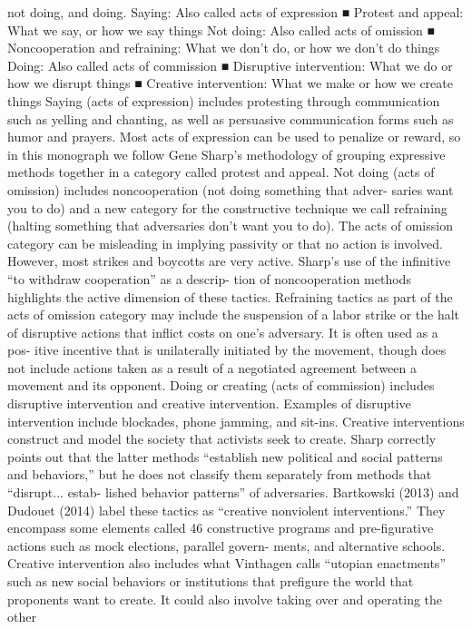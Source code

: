 \documentclass[twoside,a4paper,12pt,fleqn,openany]{extbook}
\begin{document}
not doing, and doing.
Saying: Also called acts of expression
■
 Protest and appeal: What we say, or how we say things
Not doing: Also called acts of omission
■
 Noncooperation and refraining: What we don’t do, or how we don’t do things
Doing: Also called acts of commission
■
 Disruptive intervention: What we do or how we disrupt things
■
 Creative intervention: What we make or how we create things
Saying (acts of expression) includes protesting through communication such as yelling
and chanting, as well as persuasive communication forms such as humor and prayers. Most
acts of expression can be used to penalize or reward, so in this monograph we follow Gene
Sharp’s methodology of grouping expressive methods together in a category called protest
and appeal.
Not doing (acts of omission) includes noncooperation (not doing something that adver-
saries want you to do) and a new category for the constructive technique we call refraining
(halting something that adversaries don’t want you to do). The acts of omission category can
be misleading in implying passivity or that no action is involved. However, most strikes and
boycotts are very active. Sharp’s use of the infinitive “to withdraw cooperation” as a descrip-
tion of noncooperation methods highlights the active dimension of these tactics. Refraining
tactics as part of the acts of omission category may include the suspension of a labor strike
or the halt of disruptive actions that inflict costs on one’s adversary. It is often used as a pos-
itive incentive that is unilaterally initiated by the movement, though does not include actions
taken as a result of a negotiated agreement between a movement and its opponent.
Doing or creating (acts of commission) includes disruptive intervention and creative
intervention. Examples of disruptive intervention include blockades, phone jamming, and
sit-ins. Creative interventions construct and model the society that activists seek to create.
Sharp correctly points out that the latter methods “establish new political and social patterns
and behaviors,” but he does not classify them separately from methods that “disrupt... estab-
lished behavior patterns” of adversaries. Bartkowski (2013) and Dudouet (2014) label these
tactics as “creative nonviolent interventions.” They encompass some elements called
46
constructive programs and pre-figurative actions such as mock elections, parallel govern-
ments, and alternative schools. Creative intervention also includes what Vinthagen calls
“utopian enactments” such as new social behaviors or institutions that prefigure the world
that proponents want to create. It could also involve taking over and operating the other
\end{document}
